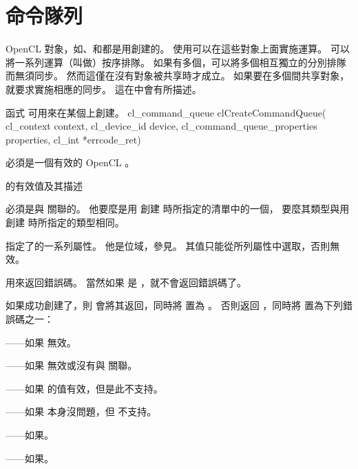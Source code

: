 \section{命令隊列}

OpenCL 對象，如、和都是用創建的。
使用可以在這些對象上面實施運算。
可以將一系列運算（叫做）按序排隊。
如果有多個，可以將多個相互獨立的分別排隊而無須同步。
然而這僅在沒有對象被共享時才成立。
如果要在多個間共享對象，就要求實施相應的同步。
這在中會有所描述。

函式  可用來在某個上創建。
\startCLFUNC
cl_command_queue clCreateCommandQueue(
			cl_context context,
			cl_device_id device,
			cl_command_queue_properties properties,
			cl_int *errcode_ret)
\stopCLFUNC

 必須是一個有效的 OpenCL 。

\startbuffer[tblcmdqprop]
的有效值及其描述
\stopbuffer
{}
{}

 必須是與  關聯的。
他要麼是用  創建  時所指定的清單中的一個，
要麼其類型與用  創建  時所指定的類型相同。

 指定了的一系列屬性。
他是位域，參見。
其值只能從所列屬性中選取，否則無效。

 用來返回錯誤碼。
當然如果  是 ，就不會返回錯誤碼了。

如果成功創建了，則  會將其返回，同時將  置為 。
否則返回 ，同時將  置為下列錯誤碼之一：
\startigBase
\item {}——如果  無效。
\item {}——如果  無效或沒有與  關聯。
\item {}——如果  的值有效，但是此不支持。
\item {}——如果  本身沒問題，但  不支持。
\item {}——如果\scdevfailres。
\item {}——如果\schostfailres。
\stopigBase

